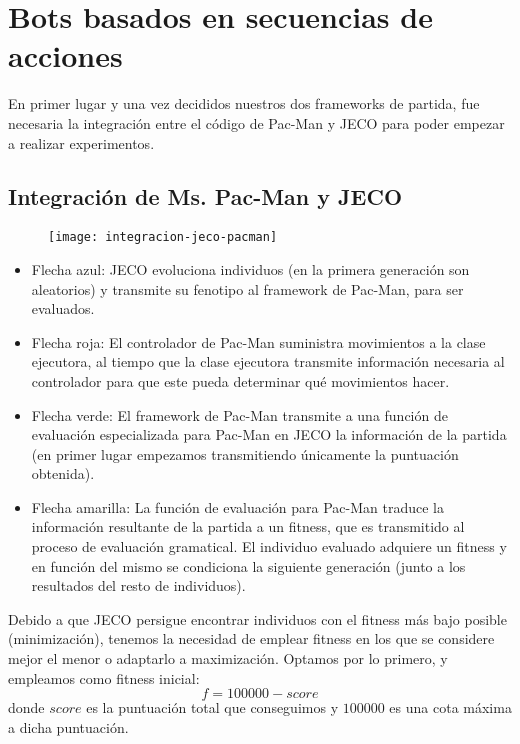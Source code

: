 \chapter{Bots basados en secuencias de acciones} \label{cap:bots-secuencia-acciones}
En primer lugar y una vez decididos nuestros dos frameworks de partida, fue necesaria la integración entre el código de Pac-Man y JECO para poder empezar a realizar experimentos.

\section{Integración de Ms. Pac-Man y JECO}
\begin{figure}[H]
\centering
\texttt{[image: integracion-jeco-pacman]}
\end{figure}
\begin{itemize}
\item Flecha azul: JECO evoluciona individuos (en la primera generación son aleatorios) y transmite su fenotipo al framework de Pac-Man, para ser evaluados.

\item Flecha roja: El controlador de Pac-Man suministra movimientos a la clase ejecutora, al tiempo que la clase ejecutora transmite información necesaria al controlador para que este pueda determinar qué movimientos hacer.

\item Flecha verde: El framework de Pac-Man transmite a una función de evaluación especializada para Pac-Man en JECO la información de la partida (en primer lugar empezamos transmitiendo únicamente la puntuación obtenida).

\item Flecha amarilla: La función de evaluación para Pac-Man traduce la información resultante de la partida a un fitness, que es transmitido al proceso de evaluación gramatical. El individuo evaluado adquiere un fitness y en función del mismo se condiciona la siguiente generación (junto a los resultados del resto de individuos).
\end{itemize}

Debido a que JECO persigue encontrar individuos con el fitness más bajo posible (minimización), tenemos la necesidad de emplear fitness en los que se considere mejor el menor o adaptarlo a maximización. Optamos por lo primero, y empleamos como fitness inicial:
\begin{equation}
f = 100000 - score
\end{equation}
donde $score$ es la puntuación total que conseguimos y $100000$ es una cota máxima a dicha puntuación.


